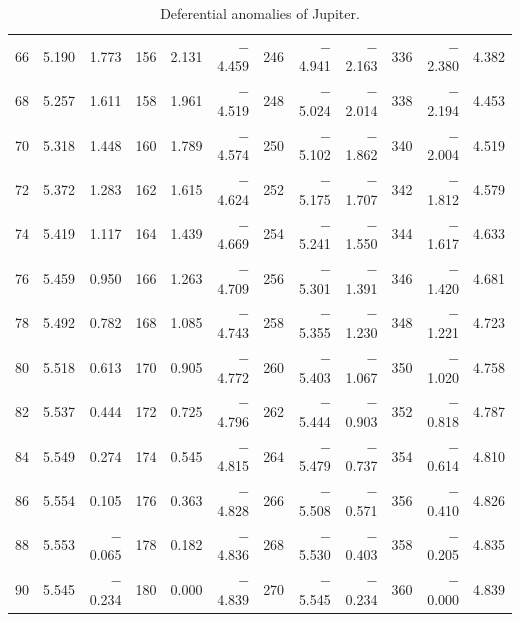 \begin{table}[!h]
{\begin{tabular}{rrr|rrr|rrr|rrr}
 66 &   5.190 &  1.773 & 156 &   2.131 & $-$4.459 & 246 &  $-$4.941 & $-$2.163 & 336 &  $-$2.380 &  4.382\\
 68 &   5.257 &  1.611 & 158 &   1.961 & $-$4.519 & 248 &  $-$5.024 & $-$2.014 & 338 &  $-$2.194 &  4.453\\
 70 &   5.318 &  1.448 & 160 &   1.789 & $-$4.574 & 250 &  $-$5.102 & $-$1.862 & 340 &  $-$2.004 &  4.519\\
 72 &   5.372 &  1.283 & 162 &   1.615 & $-$4.624 & 252 &  $-$5.175 & $-$1.707 & 342 &  $-$1.812 &  4.579\\
 74 &   5.419 &  1.117 & 164 &   1.439 & $-$4.669 & 254 &  $-$5.241 & $-$1.550 & 344 &  $-$1.617 &  4.633\\
 76 &   5.459 &  0.950 & 166 &   1.263 & $-$4.709 & 256 &  $-$5.301 & $-$1.391 & 346 &  $-$1.420 &  4.681\\
 78 &   5.492 &  0.782 & 168 &   1.085 & $-$4.743 & 258 &  $-$5.355 & $-$1.230 & 348 &  $-$1.221 &  4.723\\
 80 &   5.518 &  0.613 & 170 &   0.905 & $-$4.772 & 260 &  $-$5.403 & $-$1.067 & 350 &  $-$1.020 &  4.758\\
 82 &   5.537 &  0.444 & 172 &   0.725 & $-$4.796 & 262 &  $-$5.444 & $-$0.903 & 352 &  $-$0.818 &  4.787\\
 84 &   5.549 &  0.274 & 174 &   0.545 & $-$4.815 & 264 &  $-$5.479 & $-$0.737 & 354 &  $-$0.614 &  4.810\\
 86 &   5.554 &  0.105 & 176 &   0.363 & $-$4.828 & 266 &  $-$5.508 & $-$0.571 & 356 &  $-$0.410 &  4.826\\
 88 &   5.553 & $-$0.065 & 178 &   0.182 & $-$4.836 & 268 &  $-$5.530 & $-$0.403 & 358 &  $-$0.205 &  4.835\\
 90 &   5.545 & $-$0.234 & 180 &   0.000 & $-$4.839 & 270 &  $-$5.545 & $-$0.234 & 360 &  $-$0.000 &  4.839\\
\end{tabular}}
\caption{Deferential anomalies of Jupiter.}\label{vt12}
\end{table}


